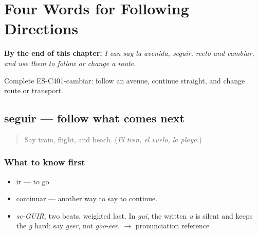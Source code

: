 
\chapter{Four Words for Following Directions}
\label{ch:la-avenida-y-seguir-recto}

\begin{chapteropening}
\textbf{By the end of this chapter:} \emph{I can say la avenida, seguir, recto and cambiar, and use them to follow or change a route.}

Complete ES-C401-cambiar: follow an avenue, continue straight, and change route or transport.
\end{chapteropening}

\section[seguir]{seguir — follow what comes next}

\label{lesson:ES-C401-seguir}



\begin{quote}
Say train, flight, and beach. (\emph{El tren, el vuelo, la playa}.)
\end{quote}

\subsection*{What to know first}
\begin{itemize}
\raggedright
  \item ir — to go.
  \item continuar — another way to say to continue.
\end{itemize}

\begin{sounds}
\begin{itemize}
\raggedright
  \item \emph{se-GUIR}, two beats, weighted last. In \emph{gui}, the written \emph{u} is silent and keeps the \emph{g} hard: say \emph{geer}, not \emph{goo-eer}. $\to$ pronunciation reference
\end{itemize}
\end{sounds}

